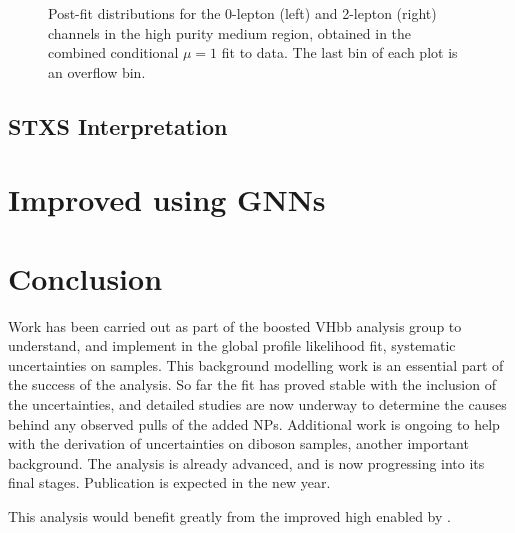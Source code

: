 \begin{figure}[!htbp]
\begin{subfigure}{.4\textwidth}
  \end{subfigure}
  \caption{
    Post-fit distributions for the 0-lepton (left) and 2-lepton (right) channels in the high purity medium \pTV region, obtained in the combined conditional $\mu=1$ fit to data. The last bin of each plot is an overflow bin.
  }
  \label{fig:vhbb postfit plots}
\end{figure}





\subsection{STXS Interpretation}


\section{Improved \texorpdfstring{\btagging}{b-tagging} using GNNs}


\section{Conclusion}

Work has been carried out as part of the boosted VHbb analysis group to understand, and implement in the global profile likelihood fit, systematic uncertainties on \Vjets samples. This background modelling work is an essential part of the success of the analysis. So far the fit has proved stable with the inclusion of the \Vjets uncertainties, and detailed studies are now underway to determine the causes behind any observed pulls of the added NPs. Additional work is ongoing to help with the derivation of uncertainties on diboson samples, another important background. The analysis is already advanced, and is now progressing into its final stages. Publication is expected in the new year.

This analysis would benefit greatly from the improved high \pt \btagging enabled by \GNN.
